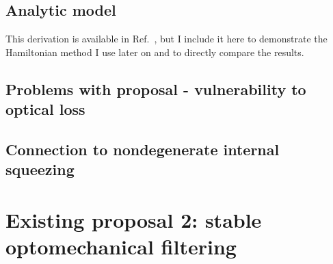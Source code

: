 


\subsection{Analytic model}

This derivation is available in Ref.~\cite{}, but I include it here to demonstrate the Hamiltonian method I use later on and to directly compare the results. 



\subsection{Problems with proposal - vulnerability to optical loss}



\subsection{Connection to nondegenerate internal squeezing}





\section{Existing proposal 2: stable optomechanical filtering}

